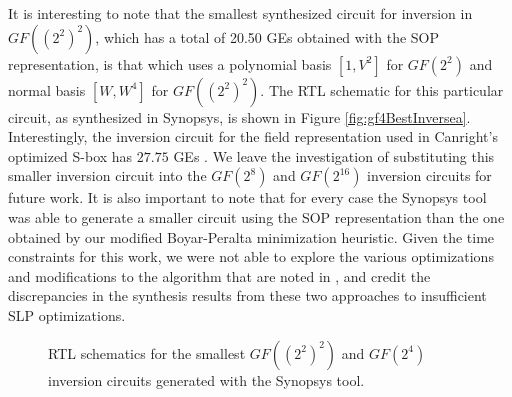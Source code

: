 It is interesting to note that the smallest synthesized circuit for inversion in $GF((2^2)^2)$, which has a total of 20.50 GEs obtained with the SOP representation, is that which uses a polynomial basis $[1, V^2]$ for $GF(2^2)$ and normal basis $[W, W^4]$ for $GF((2^2)^2)$. The RTL schematic for this particular circuit, as synthesized in Synopsys, is shown in Figure \ref{fig:gf4BestInversea}. Interestingly, the inversion circuit for the field representation used in Canright's optimized S-box has $27.75$ GEs \cite{Canright05-1}. We leave the investigation of substituting this smaller inversion circuit into the $GF(2^8)$ and $GF(2^{16})$ inversion circuits for future work. It is also important to note that for every case the Synopsys tool was able to generate a smaller circuit using the SOP representation than the one obtained by our modified Boyar-Peralta minimization heuristic. Given the time constraints for this work, we were not able to explore the various optimizations and modifications to the algorithm that are noted in \cite{Boyar12-1}, and credit the discrepancies in the synthesis results from these two approaches to insufficient SLP optimizations.
\begin{figure}[ht]
\centering
{}
\caption{RTL schematics for the smallest $GF((2^2)^2)$ and $GF(2^4)$ inversion circuits generated with the Synopsys tool.}
\end{figure}

